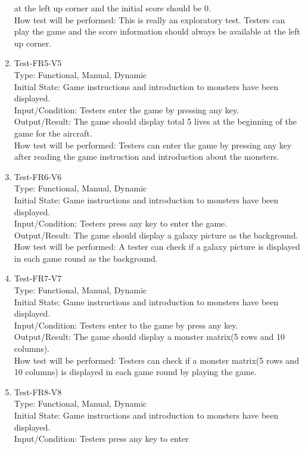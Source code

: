 \documentclass[12pt]{article}
\begin{document}
\begin{enumerate}[1.]
at the left
up corner and the initial score should be 0.\\
How test will be performed: This is really an exploratory 
test. Testers can play the game and the score information
should always be available at the left up corner.
\newpage
\item Test-FR5-V5\\
Type: Functional, Manual, Dynamic\\
Initial State: Game instructions and introduction to 
monsters have been displayed.\\
Input/Condition: Testers enter the game by pressing any key.\\
Output/Result: The game should display total 5 lives at 
the beginning of the game for the aircraft.\\
How test will be performed: Testers can enter the game 
by pressing any key after reading the game instruction and
introduction about the monsters.
\item Test-FR6-V6\\
Type: Functional, Manual, Dynamic\\
Initial State: Game instructions and introduction to 
monsters have been displayed.\\
Input/Condition: Testers press any key to enter the game.\\
Output/Result: The game should display a galaxy picture as the background.\\
How test will be performed: A tester can check if a galaxy picture is displayed in each game round as the 
background.
\item Test-FR7-V7\\
Type: Functional, Manual, Dynamic\\
Initial State: Game instructions and introduction to 
monsters have been displayed.\\
Input/Condition: Testers enter to the game by press any
key.\\
Output/Result: The game should display a monster matrix(5 rows and 10 columns).\\
How test will be performed: Testers can check if a monster matrix(5 rows and 10 columns) is displayed in each game round by playing the game.
\item Test-FR8-V8\\
Type: Functional, Manual, Dynamic\\
Initial State: Game instructions and introduction to 
monsters have been displayed.\\
Input/Condition: Testers press any key to enter

\end{enumerate}
\end{document}

